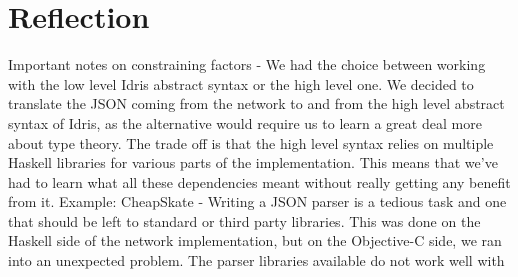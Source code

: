 \section{Reflection}
\label{sec:Reflection}

Important notes on constraining factors
  - We had the choice between working with the low level Idris abstract syntax or the high level one. We decided to translate the JSON coming from the network to and from the high level abstract syntax of Idris, as the alternative would require us to learn a great deal more about type theory. The trade off is that the high level syntax relies on multiple Haskell libraries for various parts of the implementation. This means that we’ve had to learn what all these dependencies meant without really getting any benefit from it. Example: CheapSkate
  - Writing a JSON parser is a tedious task and one that should be left to standard or third party libraries. This was done on the Haskell side of the network implementation, but on the Objective-C side, we ran into an unexpected problem. The parser libraries available do not work well with 
